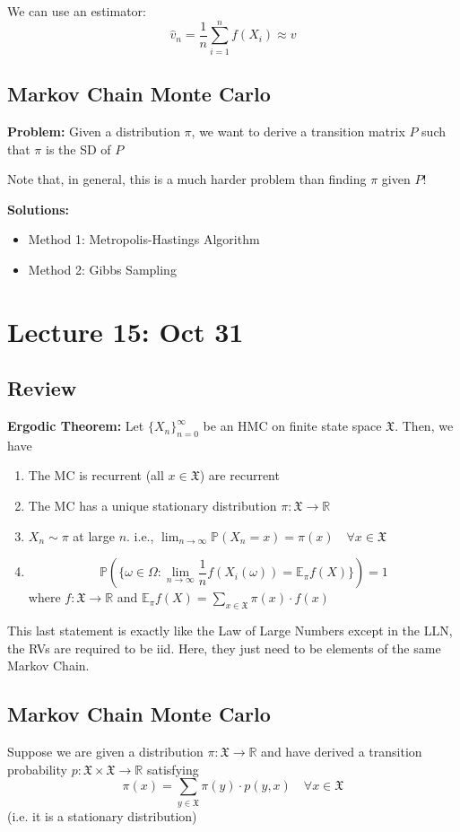 \documentclass[12pt]{article}
\renewcommand{\hat}[1]{\widehat{#1}}
\renewcommand{\P}{\mathbb{P}}
\newcommand{\R}{\mathbb{R}}
\newcommand{\E}{\mathbb{E}}
\newcommand{\mfX}{\mathfrak{X}}
\begin{document}
        We can use an estimator:
        \[\hat v_n = \frac{1}{n}\sum_{i=1}^n f(X_i) \approx v\]

    \subsection{Markov Chain Monte Carlo} 
        \textbf{Problem:} Given a distribution $\pi$, we want to derive a transition matrix $P$ such that $\pi$ is the SD of $P$ 
        
        Note that, in general, this is a much harder problem than finding $\pi$ given $P$!

       \textbf{Solutions:}
       \begin{itemize}
        \item Method 1: Metropolis-Hastings Algorithm
        \item Method 2: Gibbs Sampling
       \end{itemize}

\section{Lecture 15: Oct 31}
    \subsection{Review}
        \textbf{Ergodic Theorem:} Let $\{X_n\}_{n=0}^\infty$ be an HMC on finite state space $\mfX$. Then, we have 
        \begin{enumerate}
            \item The MC is recurrent (all $x \in \mfX$) are recurrent
            \item The MC has a unique stationary distribution $\pi: \mfX \to \R$ 
            \item $X_n \sim \pi$ at large $n$. i.e., $\lim_{n\to \infty}\P(X_n = x) = \pi(x)\quad \forall x\in \mfX$
            \item 
            \[\P(\{\omega \in \Omega: \lim_{n\to \infty} \frac{1}{n}f(X_i(\omega)) = \E_{\pi} f(X)\}) = 1\]
            where $f: \mfX \to \R$ and $\E_{\pi} f(X) = \sum_{x \in \mfX} \pi(x) \cdot f(x)$
        \end{enumerate}

        This last statement is exactly like the Law of Large Numbers except in the LLN, the RVs are required to be iid. Here, they just need to be elements of the same Markov Chain.

    \subsection{Markov Chain Monte Carlo}
        Suppose we are given a distribution $\pi: \mfX \to \R$ and have derived a transition probability $p: \mfX \times \mfX \to \R$ satisfying 
        \[\pi(x) = \sum_{y\in \mfX} \pi(y) \cdot p(y, x) \quad \forall x\in \mfX\]
        (i.e. it is a stationary distribution) 
        
\end{document}
